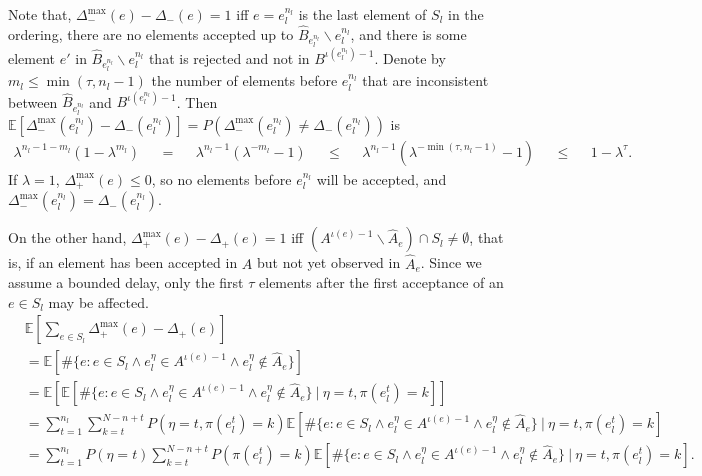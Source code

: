 Note that, $\Delta_-^{\max}(e)-\Delta_-(e) = 1$ iff $e=e_l^{n_l}$ is the last element of $S_l$ in the ordering, there are no elements accepted up to $\hat{B}_{e_l^{n_l}}\backslash e_l^{n_l}$, and there is some element $e'$ in $\hat{B}_{e_l^{n_l}}\backslash {e_l^{n_l}}$ that is rejected and not in $B^{\iota(e_l^{n_l})-1}$.
Denote by $m_l \leq \min(\tau,n_l-1)$ the number of elements before $e_l^{n_l}$ that are inconsistent between $\hat{B}_{e_l^{n_l}}$ and $B^{\iota(e_l^{n_l})-1}$.
Then $\mathbb{E}[\Delta_-^{\max}(e_l^{n_l}) - \Delta_-(e_l^{n_l})] = P(\Delta_-^{\max}(e_l^{n_l}) \neq \Delta_-(e_l^{n_l}))$ is
\begin{align*}
\lambda^{n_l-1-m_l}(1-\lambda^{m_l})
&&=&& \lambda^{n_l-1}(\lambda^{-m_l}-1)
&&\leq&& \lambda^{n_l-1}(\lambda^{-\min(\tau,n_l-1)}-1)
&&\leq&& 1 - \lambda^\tau.
\end{align*}
If $\lambda=1$, $\Delta_+^{\max}(e) \leq 0$, so no elements before $e_l^{n_l}$ will be accepted, and $\Delta_-^{\max}(e_l^{n_l}) = \Delta_-(e_l^{n_l})$.

On the other hand, $\Delta_+^{\max}(e)-\Delta_+(e) = 1$ iff $(A^{\iota(e)-1}\backslash\hat{A}_e)\cap S_l \neq\emptyset$, that is, if an element has been accepted in $A$ but not yet observed in $\hat{A}_e$.
Since we assume a bounded delay, only the first $\tau$ elements after the first acceptance of an $e\in S_l$ may be affected.
\begin{align*}
&\mathbb{E}\left[\sum_{e\in S_l}\Delta_+^{\max}(e) - \Delta_+(e)\right]\\
&= \mathbb{E}[\#\{e: e \in S_l \wedge e_l^\eta \in A^{\iota(e)-1} \wedge e_l^\eta \not\in \hat{A}_e\}]\\
&= \mathbb{E}[\mathbb{E}[\#\{e: e \in S_l \wedge e_l^\eta \in A^{\iota(e)-1} \wedge e_l^\eta \not\in \hat{A}_e\} ~|~ \eta = t, \pi(e_l^t)=k]]\\
&= \sum_{t=1}^{n_l}\sum_{k=t}^{N-n+t} P(\eta=t, \pi(e_l^t)=k) \mathbb{E}[\#\{e: e \in S_l \wedge e_l^\eta \in A^{\iota(e)-1} \wedge e_l^\eta \not\in \hat{A}_e\} ~|~ \eta = t, \pi(e_l^t)=k]\\
&= \sum_{t=1}^{n_l} P(\eta=t) \sum_{k=t}^{N-n+t} P(\pi(e_l^t)=k) \mathbb{E}[\#\{e: e \in S_l \wedge e_l^\eta \in A^{\iota(e)-1} \wedge e_l^\eta \not\in \hat{A}_e\} ~|~ \eta = t, \pi(e_l^t)=k].
\end{align*}


